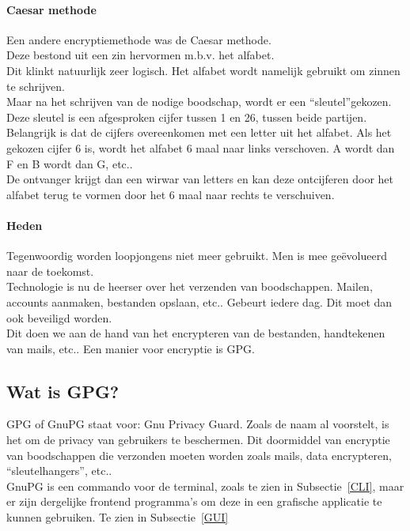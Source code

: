 \documentclass[12pt]{article}
\begin{document}
			\paragraph{Caesar methode}
				Een andere encryptiemethode was de Caesar methode.\\
				Deze bestond uit een zin hervormen m.b.v. het alfabet.\\ 
				Dit klinkt natuurlijk zeer logisch.
				Het alfabet wordt namelijk gebruikt om zinnen te schrijven.\\
				Maar na het schrijven van de nodige boodschap, wordt er een \textquotedblleft sleutel\textquotedblright gekozen. Deze sleutel is een afgesproken cijfer tussen 1 en 26, tussen beide 					partijen.\\
				Belangrijk is dat de cijfers overeenkomen met een letter uit het alfabet. Als het gekozen cijfer 6 is, wordt het alfabet 6 maal naar links verschoven. A wordt dan F 									en B wordt dan G, etc..\\
				De ontvanger krijgt dan een wirwar van letters en kan deze ontcijferen door het alfabet terug te vormen door het 6 maal naar rechts te verschuiven.\\

			\newpage
			\paragraph{Heden}
				Tegenwoordig worden loopjongens niet meer gebruikt. Men is mee ge\"evolueerd naar de toekomst.\\
				Technologie is nu de heerser over het verzenden van boodschappen.
				Mailen, accounts aanmaken, bestanden opslaan, etc.. Gebeurt iedere dag. Dit moet dan ook beveiligd worden.\\
				Dit doen we aan de hand van het encrypteren van de bestanden, handtekenen van mails,
				etc..
				Een manier voor encryptie is GPG.

			\newpage
			\subsection{Wat is GPG?}\label{Wat}
				GPG of GnuPG staat voor: Gnu Privacy Guard. Zoals de naam al voorstelt, is het om de privacy van gebruikers te beschermen. Dit doormiddel van encryptie van boodschappen 								die verzonden moeten worden zoals mails, data encrypteren, \textquotedblleft sleutelhangers\textquotedblright, etc.. \\
				GnuPG is een commando voor de terminal, zoals te zien in Subsectie~\ref{CLI}, maar er zijn dergelijke frontend programma's om deze in een grafische applicatie te 						kunnen gebruiken. Te zien in Subsectie~\ref{GUI}
\end{document}
